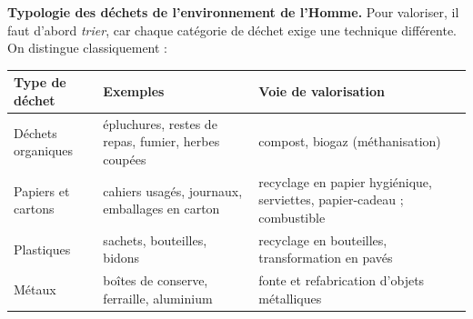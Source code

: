 \documentclass[11pt]{article}
\begin{document}
\textbf{Typologie des déchets de l'environnement de l'Homme.} Pour valoriser, il faut d'abord \emph{trier}, car chaque catégorie de déchet exige une technique différente. On distingue classiquement :

\begin{center}
\begin{tabularx}{\linewidth}{|l|X|X|}\hline
\rowcolor{popblueL} \textbf{Type de déchet} & \textbf{Exemples} & \textbf{Voie de valorisation} \\ \hline
Déchets organiques & épluchures, restes de repas, fumier, herbes coupées & compost, biogaz (méthanisation) \\ \hline
Papiers et cartons & cahiers usagés, journaux, emballages en carton & recyclage en papier hygiénique, serviettes, papier-cadeau ; combustible \\ \hline
Plastiques & sachets, bouteilles, bidons & recyclage en bouteilles, transformation en pavés \\ \hline
Métaux & boîtes de conserve, ferraille, aluminium & fonte et refabrication d'objets métalliques \\ \hline
\end{tabularx}
\end{center}
\end{document}
